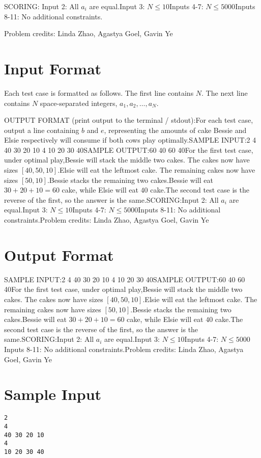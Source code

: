 \documentclass[12pt]{article}
\begin{document}
SCORING:
Input 2: All $a_i$ are equal.Input 3: $N\le 10$Inputs 4-7: $N\le 5000$Inputs 8-11: No additional constraints.


Problem credits: Linda Zhao, Agastya Goel, Gavin Ye



\section*{Input Format}
Each test case is formatted as follows. The first line contains $N$. The next
line contains $N$ space-separated integers, $a_1,a_2,\ldots,a_N$.

OUTPUT FORMAT (print output to the terminal / stdout):For each test case, output a line containing $b$ and $e$, representing the
amounts of cake Bessie and Elsie respectively will consume if both cows play
optimally.SAMPLE INPUT:2
4
40 30 20 10
4
10 20 30 40SAMPLE OUTPUT:60 40
60 40For the first test case, under optimal play,Bessie will stack the middle two cakes. The cakes now have sizes
$[40,50,10]$.Elsie will eat the leftmost cake. The remaining cakes now
have sizes
$[50,10]$.Bessie stacks the remaining two cakes.Bessie will eat $30+20+10=60$ cake, while Elsie will eat $40$ cake.The second test case is the reverse of the first, so the answer is the same.SCORING:Input 2: All $a_i$ are equal.Input 3: $N\le 10$Inputs 4-7: $N\le 5000$Inputs 8-11: No additional constraints.Problem credits: Linda Zhao, Agastya Goel, Gavin Ye

\section*{Output Format}
SAMPLE INPUT:2
4
40 30 20 10
4
10 20 30 40SAMPLE OUTPUT:60 40
60 40For the first test case, under optimal play,Bessie will stack the middle two cakes. The cakes now have sizes
$[40,50,10]$.Elsie will eat the leftmost cake. The remaining cakes now
have sizes
$[50,10]$.Bessie stacks the remaining two cakes.Bessie will eat $30+20+10=60$ cake, while Elsie will eat $40$ cake.The second test case is the reverse of the first, so the answer is the same.SCORING:Input 2: All $a_i$ are equal.Input 3: $N\le 10$Inputs 4-7: $N\le 5000$Inputs 8-11: No additional constraints.Problem credits: Linda Zhao, Agastya Goel, Gavin Ye

\section*{Sample Input}
\begin{verbatim}
2
4
40 30 20 10
4
10 20 30 40
\end{verbatim}
\end{document}
